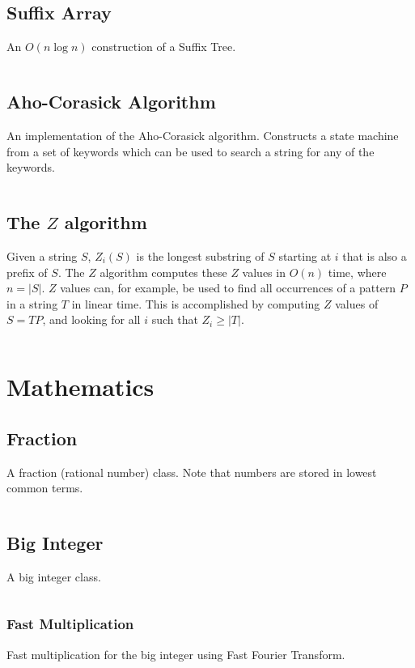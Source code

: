 \documentclass[9pt,a4paper,twocolumn,landscape,oneside]{amsart}
\newcommand{\code}[1]{\inputminted{cpp}{_code/#1}}
\begin{document}
    \subsection{Suffix Array}
        An $O(n \log n)$ construction of a Suffix Tree.
        \code{strings/suffix_array.cpp}

    \subsection{Aho-Corasick Algorithm}
        An implementation of the Aho-Corasick algorithm. Constructs a state
        machine from a set of keywords which can be used to search a string for
        any of the keywords.
        \code{strings/aho_corasick.cpp}

    \subsection{The $Z$ algorithm}
        Given a string $S$, $Z_i(S)$ is the longest substring of $S$ starting
        at $i$ that is also a prefix of $S$. The $Z$ algorithm computes these
        $Z$ values in $O(n)$ time, where $n = |S|$. $Z$ values can, for
        example, be used to find all occurrences of a pattern $P$ in a string
        $T$ in linear time. This is accomplished by computing $Z$ values of $S
        = T P$, and looking for all $i$ such that $Z_i \geq |T|$.
        \code{strings/z_algorithm.cpp}

\section{Mathematics}
    \subsection{Fraction}
        A fraction (rational number) class. Note that numbers are stored in
        lowest common terms.
        \code{mathematics/fraction.cpp}

    \subsection{Big Integer}
        A big integer class.
        \code{mathematics/intx.cpp}

        \subsubsection{Fast Multiplication}
            Fast multiplication for the big integer using Fast Fourier Transform.
            \code{mathematics/fastmul.cpp}
\end{document}
